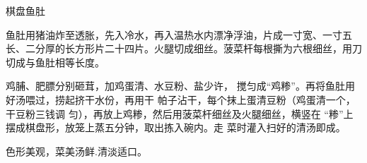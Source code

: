 \begin{recipe}{棋盘鱼肚}

\ingredients


\cooking

\step 鱼肚用猪油炸至透胀，先入冷水，再入温热水内漂净浮油，片成一寸宽、一寸五长、二分厚的长方形片二十四片。火腿切成细丝。菠菜杆每根撕为六根细丝，用刀切成与鱼肚相等长度。

鸡脯、肥膘分别砸茸，加鸡蛋清、水豆粉、盐少许， 搅匀成“鸡糁”。再将鱼肚用好汤喂过，捞起挤干水份，再用干 帕子沾干，每个抹上蛋清豆粉（鸡蛋清一个，干豆粉三钱调 匀），再放上鸡糁，然后用菠菜杆细丝及火腿细丝，横竖在 “糁”上摆成棋盘形，放笼上蒸五分钟，取出拣入碗内。走 菜时灌入扫好的清汤即成。

\notes

色形美观，菜美汤鲜.清淡适口。

\end{recipe}

